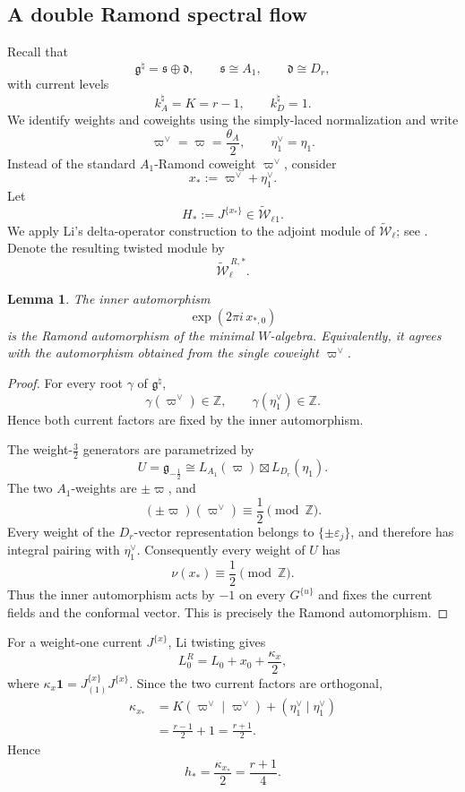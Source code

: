 \documentclass[11pt]{amsart}
\newtheorem{lemma}[theorem]{Lemma}
\theoremstyle{remark}
\numberwithin{equation}{section}
\begin{document}
\subsection{A double Ramond spectral flow}

Recall that
\[
   \mathfrak g^\natural
   =
   \mathfrak s\oplus\mathfrak d,
   \qquad
   \mathfrak s\cong A_1,
   \qquad
   \mathfrak d\cong D_r,
\]
with current levels
\[
   k_A^\natural=K=r-1,
   \qquad
   k_D^\natural=1.
\]
We identify weights and coweights using the simply-laced normalization and
write
\[
   \varpi^\vee=\varpi=\frac{\theta_A}{2},
   \qquad
   \eta_1^\vee=\eta_1.
\]
Instead of the standard \(A_1\)-Ramond coweight \(\varpi^\vee\), consider
\begin{equation}
   x_*:=\varpi^\vee+\eta_1^\vee.
\end{equation}
Let
\[
   H_*:=J^{\{x_*\}}
   \in
   \widetilde{\mathcal W}_\ell{}_1.
\]
We apply Li's delta-operator construction to the adjoint module of
\(\widetilde{\mathcal W}_\ell\); see \cite{Li1996}.  Denote the resulting
twisted module by
\[
   \widetilde{\mathcal W}_\ell^{\,R,*}.
\]

\begin{lemma}
The inner automorphism
\[
   \exp(2\pi i\,x_{*,0})
\]
is the Ramond automorphism of the minimal \(W\)-algebra.  Equivalently, it
agrees with the automorphism obtained from the single coweight
\(\varpi^\vee\).
\end{lemma}

\begin{proof}
For every root \(\gamma\) of \(\mathfrak g^\natural\),
\[
   \gamma(\varpi^\vee)\in\mathbb Z,
   \qquad
   \gamma(\eta_1^\vee)\in\mathbb Z.
\]
Hence both current factors are fixed by the inner automorphism.

The weight-\(\frac32\) generators are parametrized by
\[
   U=\mathfrak g_{-\frac12}
   \cong
   L_{A_1}(\varpi)\boxtimes L_{D_r}(\eta_1).
\]
The two \(A_1\)-weights are \(\pm\varpi\), and
\[
   (\pm\varpi)(\varpi^\vee)\equiv\frac12\pmod{\mathbb Z}.
\]
Every weight of the \(D_r\)-vector representation belongs to
\(\{\pm\varepsilon_j\}\), and therefore has integral pairing with
\(\eta_1^\vee\).  Consequently every weight of \(U\) has
\[
   \nu(x_*)\equiv\frac12\pmod{\mathbb Z}.
\]
Thus the inner automorphism acts by \(-1\) on every
\(G^{\{u\}}\) and fixes the current fields and the conformal vector.  This is
precisely the Ramond automorphism.
\end{proof}

For a weight-one current \(J^{\{x\}}\), Li twisting gives
\[
   L_0^{R}
   =
   L_0+x_0+\frac{\kappa_x}{2},
\]
where \(\kappa_x\mathbf1=J^{\{x\}}_{(1)}J^{\{x\}}\).  Since the two current
factors are orthogonal,
\[
\begin{aligned}
   \kappa_{x_*}
   &=
   K(\varpi^\vee\mid\varpi^\vee)
   +(\eta_1^\vee\mid\eta_1^\vee)\\
   &=
   \frac{r-1}{2}+1
   =
   \frac{r+1}{2}.
\end{aligned}
\]
Hence
\begin{equation}
\label{eq:double-vacuum-energy}
   h_*=\frac{\kappa_{x_*}}2=\frac{r+1}{4}.
\end{equation}
\end{document}
